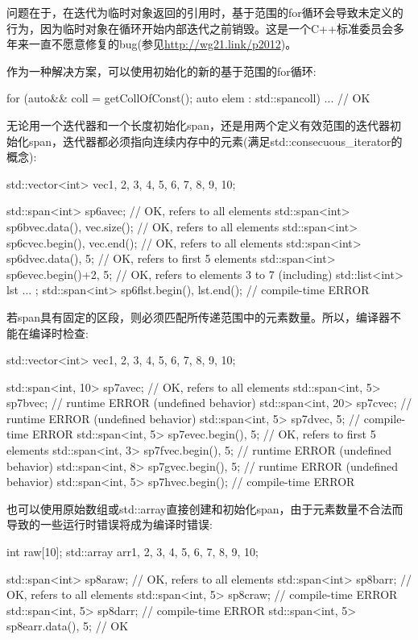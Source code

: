 问题在于，在迭代为临时对象返回的引用时，基于范围的for循环会导致未定义的行为，因为临时对象在循环开始内部迭代之前销毁。这是一个C++标准委员会多年来一直不愿意修复的bug(参见\url{http://wg21.link/p2012})。

作为一种解决方案，可以使用初始化的新的基于范围的for循环:

\begin{cpp}
for (auto&& coll = getCollOfConst(); auto elem : std::span{coll}) ... // OK
\end{cpp}

无论用一个迭代器和一个长度初始化span，还是用两个定义有效范围的迭代器初始化span，迭代器都必须指向连续内存中的元素(满足std::consecuous\_iterator的概念):

\begin{cpp}
std::vector<int> vec{1, 2, 3, 4, 5, 6, 7, 8, 9, 10};

std::span<int> sp6a{vec}; // OK, refers to all elements
std::span<int> sp6b{vec.data(), vec.size()}; // OK, refers to all elements
std::span<int> sp6c{vec.begin(), vec.end()}; // OK, refers to all elements
std::span<int> sp6d{vec.data(), 5}; // OK, refers to first 5 elements
std::span<int> sp6e{vec.begin()+2, 5}; // OK, refers to elements 3 to 7 (including)
std::list<int> lst{ ... };
std::span<int> sp6f{lst.begin(), lst.end()}; // compile-time ERROR
\end{cpp}

若span具有固定的区段，则必须匹配所传递范围中的元素数量。所以，编译器不能在编译时检查:

\begin{cpp}
std::vector<int> vec{1, 2, 3, 4, 5, 6, 7, 8, 9, 10};

std::span<int, 10> sp7a{vec}; // OK, refers to all elements
std::span<int, 5> sp7b{vec}; // runtime ERROR (undefined behavior)
std::span<int, 20> sp7c{vec}; // runtime ERROR (undefined behavior)
std::span<int, 5> sp7d{vec, 5}; // compile-time ERROR
std::span<int, 5> sp7e{vec.begin(), 5}; // OK, refers to first 5 elements
std::span<int, 3> sp7f{vec.begin(), 5}; // runtime ERROR (undefined behavior)
std::span<int, 8> sp7g{vec.begin(), 5}; // runtime ERROR (undefined behavior)
std::span<int, 5> sp7h{vec.begin()}; // compile-time ERROR
\end{cpp}

也可以使用原始数组或std::array直接创建和初始化span，由于元素数量不合法而导致的一些运行时错误将成为编译时错误:

\begin{cpp}
int raw[10];
std::array arr{1, 2, 3, 4, 5, 6, 7, 8, 9, 10};

std::span<int> sp8a{raw}; // OK, refers to all elements
std::span<int> sp8b{arr}; // OK, refers to all elements
std::span<int, 5> sp8c{raw}; // compile-time ERROR
std::span<int, 5> sp8d{arr}; // compile-time ERROR
std::span<int, 5> sp8e{arr.data(), 5}; // OK
\end{cpp}

